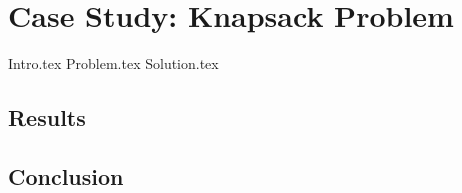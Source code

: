 \chapter{Case Study: Knapsack Problem}
\label{chap:knapsack}
  {Intro.tex}
  {Problem.tex}
  {Solution.tex}
  
  \section{Results}
  \label{sec:knapsack:res}
  
  \Blindtext

  \section{Conclusion}
  \label{sec:knapsack:concl}
  
  \Blindtext
